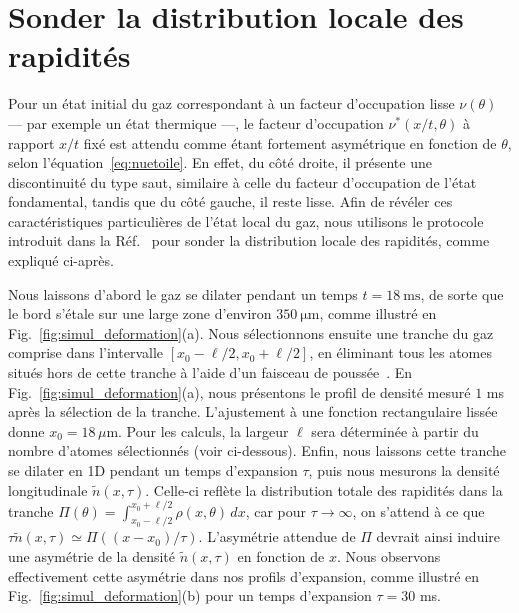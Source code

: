 \section{Sonder la distribution locale des rapidités}
\label{sec:local}

Pour un état initial du gaz correspondant à un facteur d'occupation lisse $\nu(\theta)$ — par exemple un état thermique —, le facteur d'occupation $\nu^*(x/t,\theta)$ à rapport $x/t$ fixé est attendu comme étant fortement asymétrique en fonction de $\theta$, selon l'équation~\eqref{eq:nuetoile}. En effet, du côté droite, il présente une discontinuité du type saut, similaire à celle du facteur d'occupation de l’état fondamental, tandis que du côté gauche, il reste lisse. Afin de révéler ces caractéristiques particulières de l’état local du gaz, nous utilisons le protocole introduit dans la Réf.~\cite{dubois_probing_2024} pour sonder la distribution locale des rapidités, comme expliqué ci-après.

Nous laissons d’abord le gaz se dilater pendant un temps $t=18~\mathrm{ms}$, de sorte que le bord s’étale sur une large zone d’environ $350~\mathrm{\mu m}$, comme illustré en Fig.~\ref{fig:simul_deformation}(a).  
Nous sélectionnons ensuite une tranche du gaz comprise dans l’intervalle $[x_0-\ell/2, x_0+\ell/2]$, en éliminant tous les atomes situés hors de cette tranche à l’aide d’un faisceau de poussée~\cite{dubois_probing_2024}.  
En Fig.~\ref{fig:simul_deformation}(a), nous présentons le profil de densité mesuré $1$ ms après la sélection de la tranche.  
L’ajustement à une fonction rectangulaire lissée donne $x_0 = 18\,\mu$m.  
Pour les calculs, la largeur $\ell$ sera déterminée à partir du nombre d’atomes sélectionnés (voir ci-dessous).  
Enfin, nous laissons cette tranche se dilater en 1D pendant un temps d’expansion $\tau$, puis nous mesurons la densité longitudinale $\tilde{n}(x,\tau)$.  
Celle-ci reflète la distribution totale des rapidités dans la tranche $\Pi(\theta) = \int_{x_0 - \ell/2}^{x_0 + \ell/2} \rho(x, \theta)\, dx$, car pour $\tau \rightarrow \infty$, on s’attend à ce que $\tau \tilde{n}(x,\tau) \simeq \Pi((x-x_0)/\tau)$.  
L’asymétrie attendue de $\Pi$ devrait ainsi induire une asymétrie de la densité $\tilde{n}(x,\tau)$ en fonction de $x$.  
Nous observons effectivement cette asymétrie dans nos profils d’expansion, comme illustré en Fig.~\ref{fig:simul_deformation}(b) pour un temps d’expansion $\tau=30$ ms.

